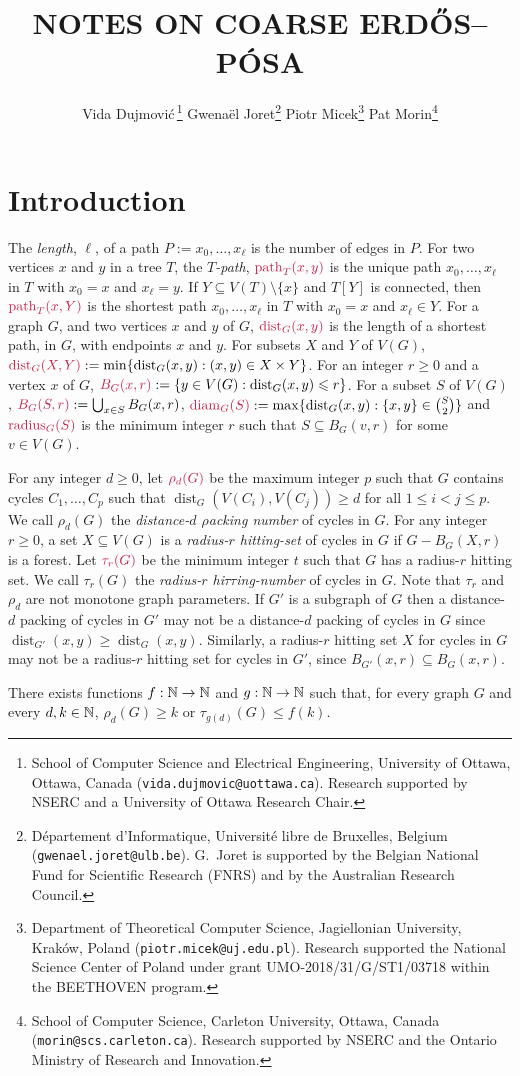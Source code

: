 \documentclass{patmorin}
\title{\MakeUppercase{Notes on Coarse {E}rdős–{P}ósa}}
\author{
 Vida Dujmovi{\'c}\,\footnote{School of Computer Science and Electrical Engineering, University of Ottawa, Ottawa, Canada (\texttt{vida.dujmovic@uottawa.ca}). Research supported by NSERC and a University of Ottawa Research Chair.}
 \qquad
 Gwena\"el Joret\footnote{D\'epartement d'Informatique, Universit\'e libre de Bruxelles, Belgium ({\tt gwenael.joret@ulb.be}). G.\ Joret is supported by the Belgian National Fund for Scientific Research (FNRS) and by the Australian Research Council.}
 \qquad
 Piotr Micek\footnote{Department of Theoretical Computer Science, Jagiellonian University, Kraków, Poland (\texttt{piotr.micek@uj.edu.pl}). Research supported
 the National Science Center of Poland under grant UMO-2018/31/G/ST1/03718 within the BEETHOVEN program.}
 \qquad
 Pat Morin\footnote{School of Computer Science, Carleton University, Ottawa, Canada (\texttt{morin@scs.carleton.ca}). Research supported by NSERC and the Ontario Ministry of Research and Innovation.}}
\date{}
\makeatletter
\renewcommand{\ge}{\geqslant}
\renewcommand{\le}{\leqslant}
\newcommand{\defin}[1]{\emph{\textcolor{brightmaroon}{#1}}}
\def\mathcolor#1#{\@mathcolor{#1}}
\def\@mathcolor#1#2#3{%
  \protect\leavevmode
  \begingroup
    \color#1{#2}#3%
  \endgroup
}
\newcommand{\mathdefin}[1]{\mathcolor{brightmaroon}{#1}}
\DeclareMathOperator{\diam}{diam}
\DeclareMathOperator{\radius}{radius}
\DeclareMathOperator{\pth}{path}
\DeclareMathOperator{\dist}{dist}
\makeatother
\begin{document}
\maketitle

\section{Introduction}

The \defin{length}, $\ell$, of a path $P:=x_0,\ldots,x_\ell$ is the number of edges in $P$.  For two vertices $x$ and $y$ in a  tree $T$, the \defin{$T$-path}, $\mathdefin{\pth_T(x,y)}$ is the unique path $x_0,\ldots,x_\ell$ in $T$ with $x_0=x$ and $x_\ell=y$. If $Y\subseteq V(T)\setminus\{x\}$ and $T[Y]$ is connected, then $\mathdefin{\pth_T(x,Y)}$ is the shortest path $x_0,\ldots,x_{\ell}$ in $T$ with $x_0=x$ and $x_\ell\in Y$.  For a graph $G$, and two vertices $x$ and $y$ of $G$, $\mathdefin{\dist_G(x,y)}$ is the length of a shortest path, in $G$, with endpoints $x$ and $y$.  For subsets $X$ and $Y$ of $V(G)$, $\mathdefin{\dist_G(X,Y)}:=\min\{\dist_G(x,y):(x,y)\in X\times Y\}$.  For an integer $r\ge 0$ and a vertex $x$ of $G$, $\mathdefin{B_G(x,r)}:=\{y\in V(G):\dist_G(x,y)\le r\}$.  For a subset $S$ of $V(G)$, $\mathdefin{B_G(S,r)}:=\bigcup_{x\in S}B_G(x,r)$, $\mathdefin{\diam_G(S)}:=\max\{\dist_G(x,y):\{x,y\}\in\binom{S}{2}\}$ and $\mathdefin{\radius_G(S)}$ is the minimum integer $r$ such that $S\subseteq B_G(v,r)$ for some $v\in V(G)$.


For any integer $d\ge 0$, let $\mathdefin{\rho_d(G)}$ be the maximum integer $p$ such that $G$ contains cycles $C_1,\ldots,C_p$ such that $\dist_G(V(C_i),V(C_j))\ge d$ for all $1\le i < j\le p$.  We call $\rho_d(G)$ the \defin{distance-$d$ $\rho$acking number} of cycles in $G$.  For any integer $r\ge 0$, a set $X\subseteq V(G)$ is a \defin{radius-$r$ hitting-set} of cycles in $G$ if $G-B_G(X,r)$ is a forest.  Let $\mathdefin{\tau_r(G)}$ be the minimum integer $t$ such that $G$ has a radius-$r$ hitting set.  We call $\tau_r(G)$ the \defin{radius-$r$ hi$\tau\tau$ing-number} of cycles in $G$.  Note that $\tau_r$ and $\rho_d$ are not monotone graph parameters.  If $G'$ is a subgraph of $G$ then a distance-$d$ packing of cycles in $G'$ may not be a distance-$d$ packing of cycles in $G$ since $\dist_{G'}(x,y)\ge \dist_G(x,y)$.  Similarly, a radius-$r$ hitting set $X$ for cycles in $G$ may not be a radius-$r$ hitting set for cycles in $G'$, since $B_{G'}(x,r)\subseteq B_{G}(x,r)$.

\begin{conj}
  There exists functions $f:\mathbb{N}\to\mathbb{N}$ and $g:\mathbb{N}\to\mathbb{N}$ such that, for every graph $G$ and every $d,k\in\mathbb{N}$, $\rho_d(G) \ge k$ or $\tau_{g(d)}(G)\le f(k)$.
\end{conj}
\end{document}
